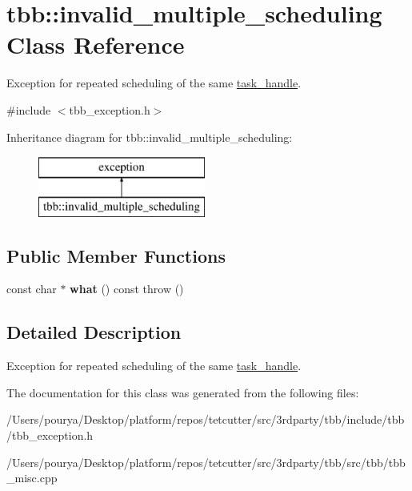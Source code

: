 \hypertarget{classtbb_1_1invalid__multiple__scheduling}{}\section{tbb\+:\+:invalid\+\_\+multiple\+\_\+scheduling Class Reference}
\label{classtbb_1_1invalid__multiple__scheduling}


Exception for repeated scheduling of the same \hyperlink{classtbb_1_1task__handle}{task\+\_\+handle}.  




{\ttfamily \#include $<$tbb\+\_\+exception.\+h$>$}

Inheritance diagram for tbb\+:\+:invalid\+\_\+multiple\+\_\+scheduling\+:\begin{figure}[H]
\begin{center}
\leavevmode
\includegraphics[height=2.000000cm]{classtbb_1_1invalid__multiple__scheduling}
\end{center}
\end{figure}
\subsection*{Public Member Functions}
\begin{DoxyCompactItemize}
\item 
\hypertarget{classtbb_1_1invalid__multiple__scheduling_ac1c3f4d2cd97301552dd0d9c4896262e}{}const char $\ast$ {\bfseries what} () const   throw ()\label{classtbb_1_1invalid__multiple__scheduling_ac1c3f4d2cd97301552dd0d9c4896262e}

\end{DoxyCompactItemize}


\subsection{Detailed Description}
Exception for repeated scheduling of the same \hyperlink{classtbb_1_1task__handle}{task\+\_\+handle}. 

The documentation for this class was generated from the following files\+:\begin{DoxyCompactItemize}
\item 
/\+Users/pourya/\+Desktop/platform/repos/tetcutter/src/3rdparty/tbb/include/tbb/tbb\+\_\+exception.\+h\item 
/\+Users/pourya/\+Desktop/platform/repos/tetcutter/src/3rdparty/tbb/src/tbb/tbb\+\_\+misc.\+cpp\end{DoxyCompactItemize}
